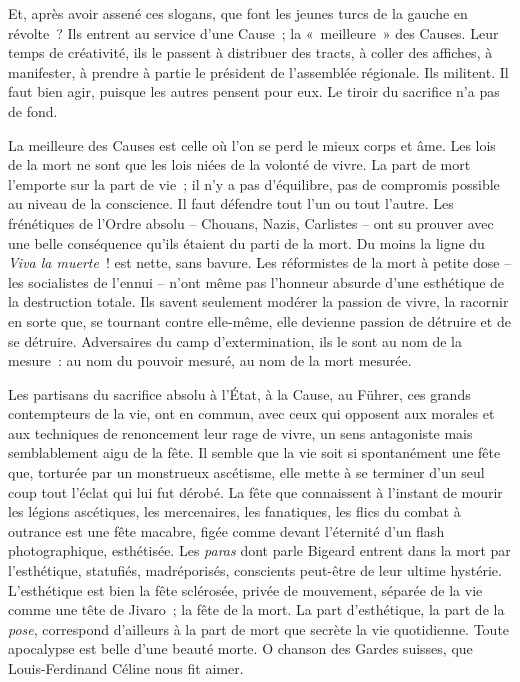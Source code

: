 \documentclass[french,twoside]{book} %
\begin{document}
\noindent Et, après avoir assené ces slogans, que font les jeunes turcs de la gauche en révolte ? Ils entrent au service d’une Cause ; la « meilleure » des Causes. Leur temps de créativité, ils le passent à distribuer des tracts, à coller des affiches, à manifester, à prendre à partie le président de l’assemblée régionale. Ils militent. Il faut bien agir, puisque les autres pensent pour eux. Le tiroir du sacrifice n’a pas de fond.\par
La meilleure des Causes est celle où l’on se perd le mieux corps et âme. Les lois de la mort ne sont que les lois niées de la volonté de vivre. La part de mort l’emporte sur la part de vie ; il n’y a pas d’équilibre, pas de compromis possible au niveau de la conscience. Il faut défendre tout l’un ou tout l’autre. Les frénétiques de l’Ordre absolu – Chouans, Nazis, Carlistes – ont su prouver avec une belle conséquence qu’ils étaient du parti de la mort. Du moins la ligne du \emph{Viva la muerte} ! est nette, sans bavure. Les réformistes de la mort à petite dose – les socialistes de l’ennui – n’ont même pas l’honneur absurde d’une esthétique de la destruction totale. Ils savent seulement modérer la passion de vivre, la racornir en sorte que, se tournant contre elle-même, elle devienne passion de détruire et de se détruire. Adversaires du camp d’extermination, ils le sont au nom de la mesure : au nom du pouvoir mesuré, au nom de la mort mesurée.\par
Les partisans du sacrifice absolu à l’État, à la Cause, au Führer, ces grands contempteurs de la vie, ont en commun, avec ceux qui opposent aux morales et aux techniques de renoncement leur rage de vivre, un sens antagoniste mais semblablement aigu de la fête. Il semble que la vie soit si spontanément une fête que, torturée par un monstrueux ascétisme, elle mette à se terminer d’un seul coup tout l’éclat qui lui fut dérobé. La fête que connaissent à l’instant de mourir les légions ascétiques, les mercenaires, les fanatiques, les flics du combat à outrance est une fête macabre, figée comme devant l’éternité d’un flash photographique, esthétisée. Les \emph{paras} dont parle Bigeard entrent dans la mort par l’esthétique, statufiés, madréporisés, conscients peut-être de leur ultime hystérie. L’esthétique est bien la fête sclérosée, privée de mouvement, séparée de la vie comme une tête de Jivaro ; la fête de la mort. La part d’esthétique, la part de la \emph{pose}, correspond d’ailleurs à la part de mort que secrète la vie quotidienne. Toute apocalypse est belle d’une beauté morte. O chanson des Gardes suisses, que Louis-Ferdinand Céline nous fit aimer.\par
\end{document}
